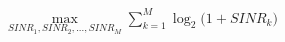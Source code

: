 \documentclass[preview]{standalone}
\begin{document}
\begin{align*}
\max_{SINR_1, SINR_2,...,SINR_M} \sum_{k=1}^{M} \log_2 \Bigg( 1 + SINR_k \Bigg)
\end{align*}
\end{document}
